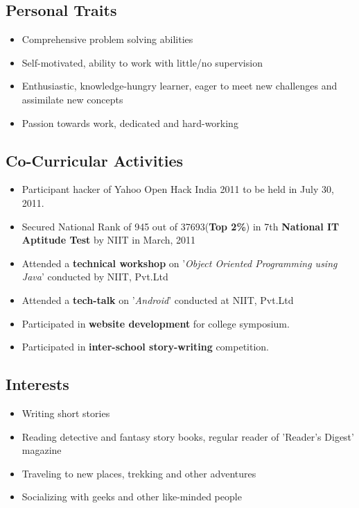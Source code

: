 \documentclass[letterpaper,10pt]{article}
\begin{document}
\subsection*{Personal Traits}
\begin{itemize}
\item Comprehensive problem solving abilities
\item Self-motivated, ability to work with little/no supervision
\item Enthusiastic, knowledge-hungry learner, eager to meet new challenges and assimilate new concepts \item Passion towards work, dedicated and hard-working
\end{itemize}


\subsection*{Co-Curricular Activities}
\begin{itemize}
\item Participant hacker of Yahoo Open Hack India 2011 to be held in July 30, 2011.
\item Secured National Rank of 945 out of 37693(\textbf{Top 2\%}) in 7th \textbf{National IT Aptitude Test} by NIIT in March, 2011 
\item Attended a \textbf{technical workshop} on '\emph{Object Oriented Programming using Java}' conducted by NIIT, Pvt.Ltd
\item	Attended a \textbf{tech-talk} on '\emph{Android}' conducted at NIIT, Pvt.Ltd
\item Participated in \textbf{website development} for college symposium.
\item Participated in \textbf{inter-school story-writing} competition.
\end{itemize}

\subsection*{Interests}
\begin{itemize}
\item Writing short stories 
\item Reading detective and fantasy story books, regular reader of 'Reader's Digest' magazine
\item Traveling to new places, trekking and other adventures
\item Socializing with geeks and other like-minded people
\end{itemize}
\end{document}
